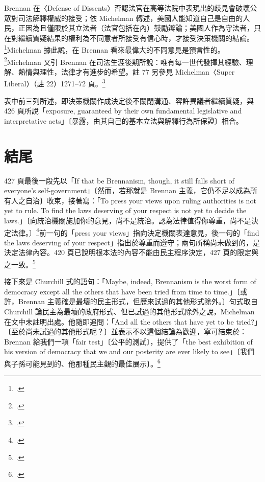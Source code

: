 Brennan 在〈Defense of Dissents〉否認法官在高等法院中表現出的歧見會破壞公眾對司法解釋權威的接受；依 Michelman 轉述，美國人能知道自己是自由的人民，正因為且僅限於其立法者（法官包括在內）鼓勵辯論；美國人作為守法者，只在對繼續質疑結果的權利為不同意者所接受有信心時，才接受決策機關的結論。\footcite[426--427 \& nn.74--75]{michelman1998}Michelman 據此說，在 Brennan 看來最偉大的不同意見是預言性的。\footcite[427 \& n.76]{michelman1998}Michelman 又引 Brennan 在司法生涯後期所說：唯有每一世代發揮其經驗、理解、熱情與理性，法律才有進步的希望。註 77 另參見 Michelman〈Super Liberal〉（註 22）1271--72 頁。\footcite[427 \& n.77]{michelman1998}

表中前三列所述，即決策機關作成決定後不關閉溝通、容許異議者繼續質疑，與 426 頁所說「exposure, guaranteed by their own fundamental legislative and interpretative acts」〔暴露，由其自己的基本立法與解釋行為所保證〕相合。

\section{結尾}
\label{sec:50_brennan-5}

427 頁最後一段先以「If that be Brennanism, though, it still falls short of everyone's self-government」〔然而，若那就是 Brennan 主義，它仍不足以成為所有人之自治〕收束，接著寫：「To press your views upon ruling authorities is not yet to rule. To find the laws deserving of your respect is not yet to decide the laws.」〔向統治機關施加你的意見，尚不是統治。認為法律值得你尊重，尚不是決定法律。〕\footcite[427]{michelman1998}前一句的「press your views」指向決定機關表達意見，後一句的「find the laws deserving of your respect」指出於尊重而遵守；兩句所稱尚未做到的，是決定法律內容。420 頁已說明根本法的內容不能由民主程序決定，427 頁的限定與之一致。\footcite[420, 426--427]{michelman1998}

接下來是 Churchill 式的語句：「Maybe, indeed, Brennanism is the worst form of democracy except all the others that have been tried from time to time.」〔或許，Brennan 主義確是最壞的民主形式，但歷來試過的其他形式除外。〕句式取自 Churchill 論民主為最壞的政府形式、但已試過的其他形式除外之說，Michelman 在文中未註明出處。他隨即追問：「And all the others that have yet to be tried?」〔至於尚未試過的其他形式呢？〕並表示不以這個結論為歡迎，寧可結束於：Brennan 給我們一項「fair test」〔公平的測試〕，提供了「the best exhibition of his version of democracy that we and our posterity are ever likely to see」〔我們與子孫可能見到的、他那種民主觀的最佳展示〕。\footcite[427]{michelman1998}


